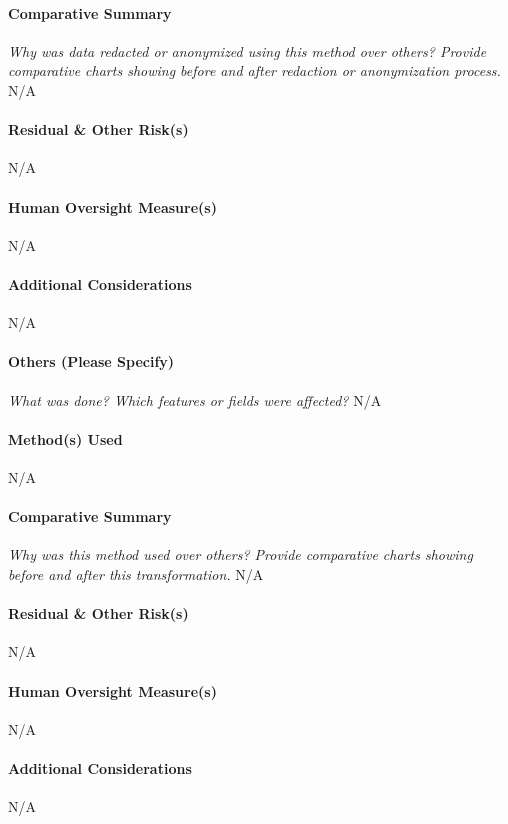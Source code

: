 \paragraph{Comparative Summary}
\textit{Why was data redacted or anonymized using this method over others? Provide comparative charts showing before and after redaction or anonymization process.}
N/A

\paragraph{Residual \& Other Risk(s)}
N/A

\paragraph{Human Oversight Measure(s)}
N/A

\paragraph{Additional Considerations}
N/A

\paragraph{Others (Please Specify)}
\textit{What was done? Which features or fields were affected?}
N/A

\paragraph{Method(s) Used}
N/A

\paragraph{Comparative Summary}
\textit{Why was this method used over others? Provide comparative charts showing before and after this transformation.}
N/A

\paragraph{Residual \& Other Risk(s)}
N/A

\paragraph{Human Oversight Measure(s)}
N/A

\paragraph{Additional Considerations}
N/A

